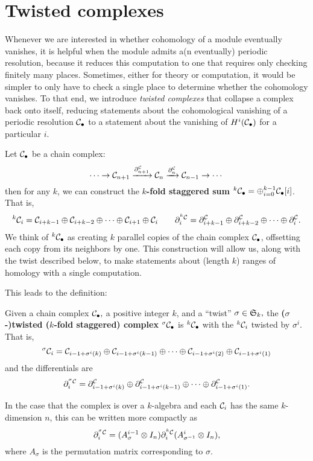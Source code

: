 \documentclass [11pt, proquest] {uwthesis}[2020/02/24]
\begin{document}
\section{Twisted complexes}
    Whenever we are interested in whether cohomology of a module eventually vanishes, it is helpful when the module admits a(n eventually) periodic resolution, because it reduces this computation to one that requires only checking finitely many places. Sometimes, either for theory or computation, it would be simpler to only have to check a single place to determine whether the cohomology vanishes. To that end, we introduce \textit{twisted complexes} that collapse a complex back onto itself, reducing statements about the cohomological vanishing of a periodic resolution $\mathcal{C}_\bullet$ to a statement about the vanishing of $H^i(\mathcal{C}_\bullet)$ for a particular $i$.

    Let $\mathcal{C}_\bullet$ be a chain complex:
    \[\cdots\to\mathcal{C}_{n+1}\xrightarrow{\partial^{\mathcal{C}}_{n+1}}\mathcal{C}_n\xrightarrow{\partial^{\mathcal{C}}_n}\mathcal{C}_{n-1}\to\cdots\]
    then for any $k$, we can construct the \textbf{$k$-fold staggered sum} $^k\mathcal{C}_\bullet=\oplus_{i=0}^{k-1}\mathcal{C}_\bullet[i]$. That is,
    \[^k\mathcal{C}_i = \mathcal{C}_{i+k-1}\oplus\mathcal{C}_{i+k-2}\oplus\cdots\oplus \mathcal{C}_{i+1}\oplus \mathcal{C}_i\qquad \partial^{^k\mathcal{C}}_{i}=\partial^{\mathcal{C}}_{i+k-1} \oplus\partial^{\mathcal{C}}_{i+k-2} \oplus\cdots\oplus\partial^{\mathcal{C}}_i.\]
    We think of $^k\mathcal{C}_\bullet$ as creating $k$ parallel copies of the chain complex $\mathcal{C}_\bullet$, offsetting each copy from its neighbors by one. This construction will allow us, along with the twist described below, to make statements about (length $k$) ranges of homology with a single computation.
    
    This leads to the definition:
    \begin{defn}\label{def:twisted-complex}
        Given a chain complex $\mathcal{C}_\bullet,$ a positive integer $k$, and a ``twist'' $\sigma\in\mathfrak{S}_k,$ the \textbf{($\sigma$-)twisted ($k$-fold staggered) complex} $^\sigma\mathcal{C}_\bullet$ is $^k\mathcal{C}_\bullet$ with the $^k\mathcal{C}_i$ twisted by $\sigma^i$. That is,
        \begin{equation}\label{eqn:twisted-complex}
            ^\sigma\mathcal{C}_i=\mathcal{C}_{i-1+\sigma^i(k)}\oplus\mathcal{C}_{i-1+\sigma^i(k-1)}\oplus\cdots\oplus \mathcal{C}_{i-1+\sigma^i(2)}\oplus \mathcal{C}_{i-1+\sigma^i(1)}
        \end{equation}
        and the differentials are
        \[\partial^{^\sigma\mathcal{C}}_i=\partial^{\mathcal{C}}_{i-1+\sigma^i(k)}\oplus\partial^{\mathcal{C}}_{i-1+\sigma^i(k-1)}\oplus\cdots\oplus \partial^{\mathcal{C}}_{i-1+\sigma^i(1)}.\]
    \end{defn}
    \begin{rmk}
        In the case that the complex is over a $k$-algebra and each $\mathcal{C}_i$ has the same $k$-dimension $n$, this can be written more compactly as
        \[\partial^{^\sigma\mathcal{C}}_i=(A_{\sigma}^{i-1}\otimes I_n)\partial_i^{^k\mathcal{C}}(A_{\sigma^{-1}}^i\otimes I_n),\]
        where $A_\sigma$ is the permutation matrix corresponding to $\sigma$.
    \end{rmk}
    
\end{document}
